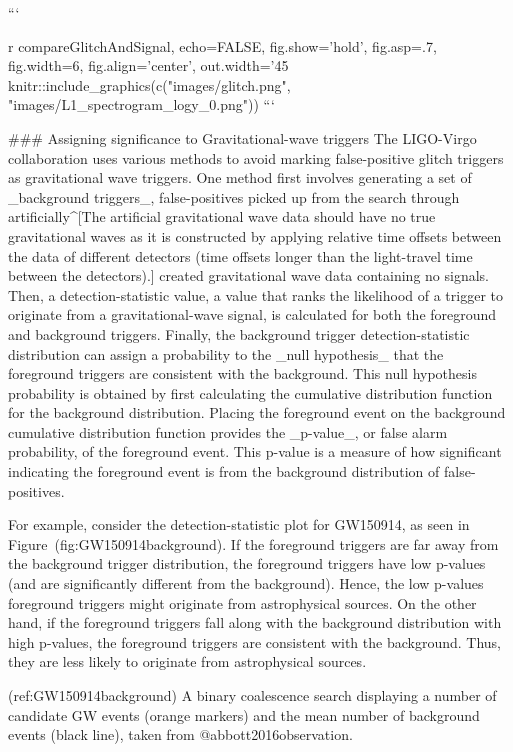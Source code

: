 ```{r compareGlitchAndSignal, echo=FALSE, fig.show='hold', fig.asp=.7, fig.width=6, fig.align='center', out.width='45%
knitr::include_graphics(c("images/glitch.png", "images/L1_spectrogram_logy_0.png"))
```


### Assigning significance to Gravitational-wave triggers
The LIGO-Virgo collaboration uses various methods to avoid marking false-positive glitch triggers as gravitational wave
triggers. One method first involves generating a set of _background triggers_, false-positives picked up from the search
through artificially^[The artificial gravitational wave data
should have no true gravitational waves as it is constructed by applying relative time offsets between the data of different detectors (time offsets longer than the light-travel time between the detectors).] created gravitational
wave data containing no signals. Then, a detection-statistic value, a value
that ranks the likelihood of a trigger to originate from a gravitational-wave signal,  is calculated for both the
foreground and background triggers. Finally, the background trigger detection-statistic distribution can assign a probability to the _null hypothesis_ that the foreground triggers are consistent with the background. This null hypothesis probability is obtained by first calculating the cumulative distribution function for the background distribution. Placing the foreground event on the background cumulative distribution function provides the  _p-value_, or false alarm probability, of the foreground event. This p-value is a measure of how significant indicating the foreground event is from the background distribution of false-positives. 

For example, consider the
detection-statistic plot for GW150914, as seen in Figure~\@ref(fig:GW150914background). If the
foreground triggers are far away from the background trigger distribution, the foreground triggers have low p-values (and are significantly
different from the background). Hence, the low p-values foreground triggers might originate from astrophysical sources. On the other hand, if the foreground
triggers fall along with the background distribution with high p-values, the foreground triggers are consistent with the background. Thus,
they are less likely to originate from astrophysical sources.  

(ref:GW150914background) A binary coalescence search displaying a number of candidate GW events (orange markers) and the mean number of background events (black line), taken from @abbott2016observation.

}
